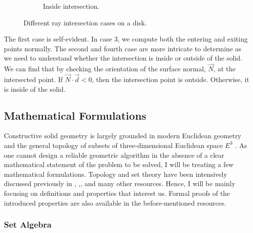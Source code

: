 \documentclass[a4paper,11pt,oneside]{article}
\begin{document}
\begin{figure}[ht]
\begin{subfigure}[b]{0.4\textwidth}
         \caption{Inside intersection.}
         \label{sec3.1:inside-intersection}
     \end{subfigure}
        \caption{Different ray intersection cases on a disk.}
        \label{sec3.1:intersection-cases}
\end{figure}


The first case is self-evident. In case 3, we compute both the entering and exiting points normally. The second and fourth case are more intricate to determine as we need to understand whether the intersection is inside or outside of the solid. We can find that by checking the orientation of the surface normal, $\vec{N}$, at the intersected point. If $\vec{N}\cdot\vec{d} < 0$, then the intersection point is outside. Otherwise, it is inside of the solid.

\subsection{Mathematical Formulations}
  
Constructive solid geometry is largely grounded in modern Euclidean geometry and the general topology of subsets of three-dimensional Euclidean space $E^3$ \cite{Requicha1978MathematicalFO}. As one cannot design a reliable geometric algorithm in the absence of a clear mathematical statement of the problem to be solved, I will be treating a few mathematical formulations. Topology and set theory have been intensively discussed previously in \cite{Requicha1978MathematicalFO}, \cite{tilove1977a},\cite{lachlan_srebrny_zarach_1977}, and many other resources. Hence, I will be mainly focusing on definitions and properties that interest us. Formal proofs of the introduced properties are also available in the before-mentioned resources.
  
\subsubsection{Set Algebra}
  
\theoremstyle{definition}
\newtheorem{definition}{Definition}[section]
  
\theoremstyle{property}
\newtheorem{property}{Property}[section]
    
\theoremstyle{remark}
\newtheorem*{remark}{Remark}
      
\end{document}

